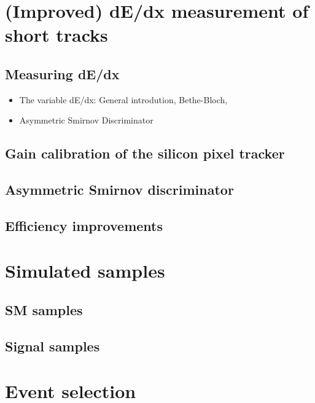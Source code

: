 \section{(Improved) dE/dx measurement of short tracks}
\label{sec:DeDxMeasurement}
\subsection{Measuring dE/dx}
\begin{itemize}
\item The variable dE/dx: General introdution, Bethe-Bloch, 
\item Asymmetric Smirnov Discriminator
\end{itemize}
\subsection{Gain calibration of the silicon pixel tracker}
\subsection{Asymmetric Smirnov discriminator}
\subsection{Efficiency improvements}

\section{Simulated samples}
\label{sec:SimulatedSamples}
\subsection{SM samples}
\subsection{Signal samples}

\section{Event selection}
\label{sec:EventSelection}
